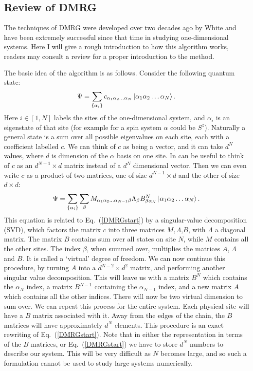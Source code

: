 \subsection{Review of DMRG}

The techniques of DMRG were developed over two decades ago by White\cite{WhiteDMRG} and have been extremely successful since that time in studying one-dimensional systems. Here I will give a rough introduction to how this algorithm works, readers may consult a review for a proper introduction to the method\cite{Schollwock}.

The basic idea of the algorithm is as follows. Consider the following quantum state:
\begin{equation}
\Psi=\sum_{\{\alpha_i\}} c_{\alpha_1\alpha_2\ldots\alpha_N}\ket{\alpha_1\alpha_2\ldots\alpha_N}.
\label{DMRGstart}
\end{equation}
Here $i\in[1,N]$ labels the sites of the one-dimensional system, and $\alpha_i$ is an eigenstate of that site (for example for a spin system $\alpha$ could be $S^z$). Naturally a general state is a sum over all possible eigenvalues on each site, each with a coefficient labelled $c$. We can think of $c$ as being a vector, and it can take $d^N$ values, where $d$ is dimension of the $\alpha$ basis on one site. In can be useful to think of $c$ as an $d^{N-1}\times d$ matrix instead of a $d^N$ dimensional vector. Then we can even write $c$ as a product of two matrices, one of size $d^{N-1}\times d$ and the other of size $d\times d$:
\begin{equation}
\Psi=\sum_{\{\alpha_i\}}\sum_\beta M_{\alpha_1\alpha_2\ldots\alpha_{N-1}\beta}\Lambda_\beta B^N_{\beta\alpha_N}\ket{\alpha_1\alpha_2\ldots\alpha_N}.
\end{equation}
This equation is related to Eq.~(\ref{DMRGstart}) by a singular-value decomposition (SVD), which factors the matrix $c$ into three matrices $M,\Lambda$,$B$, with $\Lambda$ a diagonal matrix. The matrix $B$ contains sum over all states on site $N$, while $M$ contains all the other sites. The index $\beta$, when summed over, multiplies the matrices $A$, $\Lambda$ and $B$. It is called a `virtual' degree of freedom. We can now continue this procedure, by turning $A$ into a $d^{N-2}\times d^2$ matrix, and performing another singular value decomposition. This will leave us with a matrix $B^N$ which contains the $\alpha_N$ index, a matrix $B^{N-1}$ containing the $\alpha_{N-1}$ index, and a new matrix $A$ which contains all the other indices. There will now be two virtual dimension to sum over. We can repeat this process for the entire system. Each physical site will have a $B$ matrix associated with it. Away from the edges of the chain, the $B$ matrices will have approximately $d^N$ elements. This procedure is an exact rewriting of Eq.~(\ref{DMRGstart}). Note that in either the representation in terms of the $B$ matrices, or Eq.~(\ref{DMRGstart}) we have to store $d^N$ numbers to describe our system. This will be very difficult as $N$ becomes large, and so such a formulation cannot be used to study large systems numerically.


